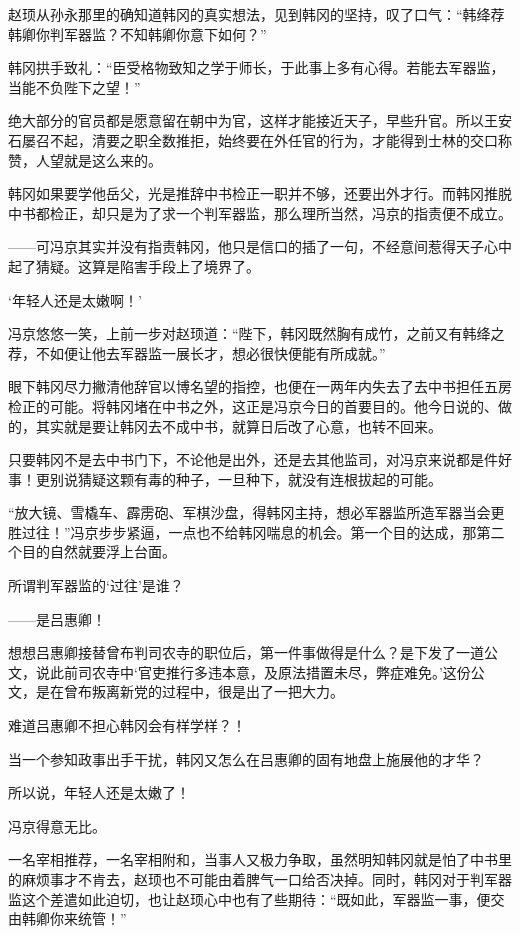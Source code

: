 赵顼从孙永那里的确知道韩冈的真实想法，见到韩冈的坚持，叹了口气：“韩绛荐韩卿你判军器监？不知韩卿你意下如何？”

韩冈拱手致礼：“臣受格物致知之学于师长，于此事上多有心得。若能去军器监，当能不负陛下之望！”

绝大部分的官员都是愿意留在朝中为官，这样才能接近天子，早些升官。所以王安石屡召不起，清要之职全数推拒，始终要在外任官的行为，才能得到士林的交口称赞，人望就是这么来的。

韩冈如果要学他岳父，光是推辞中书检正一职并不够，还要出外才行。而韩冈推脱中书都检正，却只是为了求一个判军器监，那么理所当然，冯京的指责便不成立。

——可冯京其实并没有指责韩冈，他只是信口的插了一句，不经意间惹得天子心中起了猜疑。这算是陷害手段上了境界了。

‘年轻人还是太嫩啊！’

冯京悠悠一笑，上前一步对赵顼道：“陛下，韩冈既然胸有成竹，之前又有韩绛之荐，不如便让他去军器监一展长才，想必很快便能有所成就。”

眼下韩冈尽力撇清他辞官以博名望的指控，也便在一两年内失去了去中书担任五房检正的可能。将韩冈堵在中书之外，这正是冯京今日的首要目的。他今日说的、做的，其实就是要让韩冈去不成中书，就算日后改了心意，也转不回来。

只要韩冈不是去中书门下，不论他是出外，还是去其他监司，对冯京来说都是件好事！更别说猜疑这颗有毒的种子，一旦种下，就没有连根拔起的可能。

“放大镜、雪橇车、霹雳砲、军棋沙盘，得韩冈主持，想必军器监所造军器当会更胜过往！”冯京步步紧逼，一点也不给韩冈喘息的机会。第一个目的达成，那第二个目的自然就要浮上台面。

所谓判军器监的‘过往’是谁？

——是吕惠卿！

想想吕惠卿接替曾布判司农寺的职位后，第一件事做得是什么？是下发了一道公文，说此前司农寺中‘官吏推行多违本意，及原法措置未尽，弊症难免。’这份公文，是在曾布叛离新党的过程中，很是出了一把大力。

难道吕惠卿不担心韩冈会有样学样？！

当一个参知政事出手干扰，韩冈又怎么在吕惠卿的固有地盘上施展他的才华？

所以说，年轻人还是太嫩了！

冯京得意无比。

一名宰相推荐，一名宰相附和，当事人又极力争取，虽然明知韩冈就是怕了中书里的麻烦事才不肯去，赵顼也不可能由着脾气一口给否决掉。同时，韩冈对于判军器监这个差遣如此迫切，也让赵顼心中也有了些期待：“既如此，军器监一事，便交由韩卿你来统管！”

